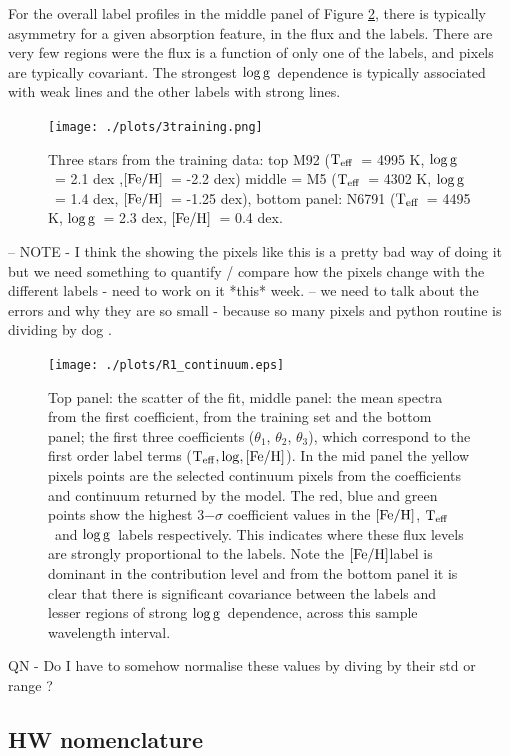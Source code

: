 \documentclass[12pt, preprint]{aastex}
\newcommand{\teff}{\mbox{$\rm T_{eff}$}}
\newcommand{\feh}{\mbox{$\rm [Fe/H]$}}
\newcommand{\logg}{\mbox{$\rm \log g$}}
\begin{document}
For the overall label profiles in the middle panel of Figure \ref{fig:coeffs}, there is typically asymmetry for a given absorption feature, in the flux and the labels. There are very few regions were the flux is a function of only one of the labels, and pixels are typically covariant. The strongest \logg\ dependence is typically associated with weak lines and the other labels with strong lines. 



\begin{figure}[h!]
  \texttt{[image: ./plots/3training.png]}
\caption{Three stars from the training data: top M92 (\teff\ = 4995 K, \logg\ = 2.1 dex ,\feh\, = -2.2 dex) middle = M5 (\teff\ = 4302 K, \logg\ = 1.4 dex, \feh\ = -1.25 dex), bottom panel: N6791 (\teff\  = 4495 K, \logg\ = 2.3 dex, \feh\ = 0.4 dex. }
\label{fig:cal_feh}
\end{figure}


-- NOTE - I think the showing the pixels like this is a pretty bad way of doing it but we need something to quantify / compare how the pixels change with the different labels - need to work on it *this* week. 
 -- we need to talk about the errors and why they are so small - because so many pixels and python routine is dividing by dog .
 
 
\begin{figure}[h!]
  \texttt{[image: ./plots/R1\_continuum.eps]}
\caption{Top panel: the scatter of the fit, middle panel: the mean spectra from the first coefficient, from the training set and the bottom panel; the first three coefficients ($\theta_1$, $\theta_2$, $\theta_3$),  which correspond to the first order label terms ($\teff, \log, \feh$). In the mid panel the yellow pixels points are the selected continuum pixels from the coefficients and continuum returned by the model.  The red, blue and green points show the highest 3$-\sigma$ coefficient values in the \feh, \teff\ and \logg\ labels respectively. This indicates where these flux levels are strongly proportional to the labels. Note the \feh label is dominant in the contribution level and from the bottom panel it is clear that there is significant covariance between the labels and lesser regions of strong \logg\ dependence, across this sample wavelength interval.}
\label{fig:coeffs}
\end{figure}
QN  - Do I have to somehow normalise these values by diving by their std or range ? 

\subsection{HW nomenclature}
\end{document}
